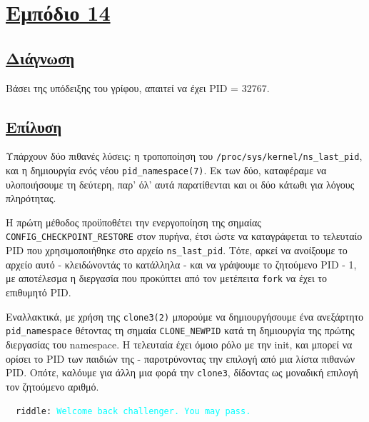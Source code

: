 \documentclass[12pt]{article}
\newcommand{\eng}[1]{\foreignlanguage{english}{#1}}
\newcommand{\engt}[1]{\foreignlanguage{english}{\texttt{#1}}}
\begin{document}
\section*{\ul{Εμπόδιο 14}}
\subsection*{\ul{Διάγνωση}}
Βάσει της υπόδειξης του γρίφου, απαιτεί να έχει \eng{PID = 32767}.
\subsection*{\ul{Επίλυση}}
Υπάρχουν δύο πιθανές λύσεις: η τροποποίηση του \engt{/proc/sys/kernel/ns\_last\_pid}, και η δημιουργία ενός νέου \engt{pid\_namespace(7)}. Εκ των δύο, καταφέραμε να υλοποιήσουμε τη δεύτερη, παρ' όλ' αυτά παρατίθενται και οι δύο κάτωθι για λόγους πληρότητας.

Η πρώτη μέθοδος προϋποθέτει την ενεργοποίηση της σημαίας \engt{CONFIG\_CHECKPOINT\_RESTORE} στον πυρήνα, έτσι ώστε να καταγράφεται το τελευταίο \eng{PID} που χρησιμοποιήθηκε στο αρχείο \engt{ns\_last\_pid}.
Τότε, αρκεί να ανοίξουμε το αρχείο αυτό - κλειδώνοντάς το κατάλληλα - και να γράψουμε το ζητούμενο \eng{PID - 1}, με αποτέλεσμα η διεργασία που προκύπτει από τον μετέπειτα \engt{fork} να έχει το επιθυμητό \eng{PID}.

Εναλλακτικά, με χρήση της \engt{clone3(2)} μπορούμε να δημιουργήσουμε ένα ανεξάρτητο \engt{pid\_namespace} θέτοντας τη σημαία \engt{CLONE\_NEWPID} κατά τη δημιουργία της πρώτης διεργασίας του \eng{namespace}. Η τελευταία έχει όμοιο ρόλο με την \eng{init}, και μπορεί να ορίσει το \eng{PID} των παιδιών της - παροτρύνοντας την επιλογή από μια λίστα πιθανών \eng{PID}. Οπότε, καλόυμε για άλλη μια φορά την \engt{clone3}, δίδοντας ως μοναδική επιλογή τον ζητούμενο αριθμό.

\vspace{5mm}
\noindent\textcolor{gray!40}{\hrulefill}~~\texttt{\small \eng{riddle: \textcolor{cyan}{Welcome back challenger. You may pass.}}}~~\textcolor{gray!40}{\hrulefill}
\vspace{5mm}
\end{document}
